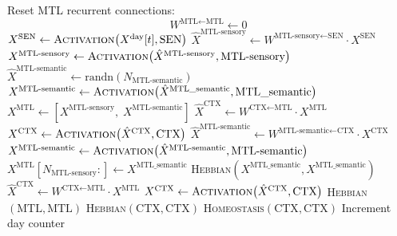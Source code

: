 \documentclass{article}
\begin{document}
\begin{algorithm}[h!]
\caption{Wake}\label{alg:wake}
\begin{algorithmic}[1]
        \State Reset MTL recurrent connections:
            \[
                W^{\textrm{MTL} \leftarrow \textrm{MTL}} \gets 0
            \]
        \State $X^{\textrm{SEN}} \gets \textsc{Activation}\bigl(X^{\textrm{day}}[t], \textrm{SEN}\bigr)$
        \State $\hat{X}^{\textrm{MTL-sensory}} 
            \gets 
            W^{\textrm{MTL-sensory} \leftarrow \textrm{SEN}} 
            \cdot X^{\textrm{SEN}}$
        \State $X^{\textrm{MTL-sensory}} 
            \gets 
            \textsc{Activation}\bigl(\hat{X}^{\textrm{MTL-sensory}}, \textrm{MTL-sensory}\bigr)$
        \State $\hat{X}^{\textrm{MTL-semantic}} 
            \gets 
            \text{randn}(N_\textrm{MTL-semantic})$
        \State $X^{\textrm{MTL-semantic}} 
            \gets 
            \textsc{Activation}\bigl(\hat{X}^{\textrm{MTL\_semantic}}, \textrm{MTL\_semantic}\bigr)$
        \State $X^{\textrm{MTL}} 
            \gets 
            [X^{\textrm{MTL-sensory}}, \; X^{\textrm{MTL-semantic}}]$
        \State $\hat{X}^{\textrm{CTX}} 
            \gets 
            W^{\textrm{CTX} \leftarrow \textrm{MTL}} 
            \cdot X^{\textrm{MTL}}$
        \State $X^{\textrm{CTX}} 
            \gets 
            \textsc{Activation}\bigl(\hat{X}^{\textrm{CTX}}, \textrm{CTX}\bigr)$
            \State $\hat{X}^{\textrm{MTL-semantic}} 
                \gets 
                W^{\textrm{MTL-semantic} \leftarrow \textrm{CTX}} 
                \cdot X^{\textrm{CTX}}$
            \State $X^{\textrm{MTL-semantic}} 
                \gets 
                \textsc{Activation}\bigl(\hat{X}^{\textrm{MTL-semantic}}, \textrm{MTL-semantic}\bigr)$
            \State $X^{\textrm{MTL}}[N_\textrm{MTL-sensory}:] 
                \gets 
                X^{\textrm{MTL\_semantic}}$
            \State \textsc{Hebbian}$(X^{\textrm{MTL\_semantic}}, X^{\textrm{MTL\_semantic}})$
        \EndIf
            \State $\hat{X}^{\textrm{CTX}} 
                \gets 
                W^{\textrm{CTX} \leftarrow \textrm{MTL}} 
                \cdot X^{\textrm{MTL}}$
            \State $X^{\textrm{CTX}} 
                \gets 
                \textsc{Activation}\bigl(\hat{X}^{\textrm{CTX}}, \textrm{CTX}\bigr)$
        \EndIf
        \State \textsc{Hebbian}$(\textrm{MTL}, \textrm{MTL})$
        \State \textsc{Hebbian}$(\textrm{CTX}, \textrm{CTX})$
        \State \textsc{Homeostasis}$(\textrm{CTX}, \textrm{CTX})$
    \EndFor
    \State Increment day counter
\EndFunction
\end{algorithmic}
\end{algorithm}
\end{document}
